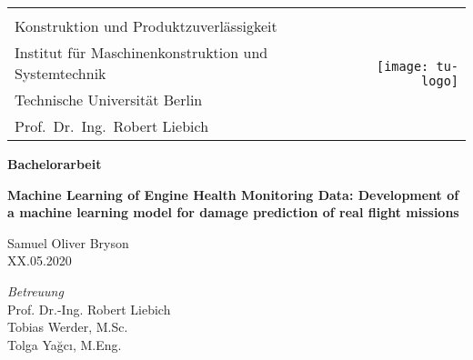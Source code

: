 
\begin{titlepage}

   {\footnotesize
   \begin{tabular}{l r}
      & \multirow{5}{*}{\hspace{5em}\texttt{[image: tu-logo]}} \\
      Konstruktion und Produktzuverl\"assigkeit \\
      Institut f\"ur Maschinenkonstruktion und Systemtechnik \\
      Technische Universit\"at Berlin \\
      Prof.~Dr.~Ing.~Robert Liebich \\
   \end{tabular}}

   {\centering

   \vspace{4.5cm}
   {\LARGE\bfseries Bachelorarbeit\par}
   \vspace{1.5cm}
   {\Large \textbf{Machine Learning of Engine Health Monitoring Data: Development of a machine learning model for damage prediction of real flight missions}\par}
   \vspace{1cm}

   \vspace{1cm}
   {\Large Samuel Oliver Bryson} \\
   \vspace{0.5cm}
   {\large XX.05.2020} \\}

   \vspace{3.5cm}
   \large{\textit{Betreuung}} \vspace{0.5cm} \\
   Prof. Dr.-Ing. Robert Liebich \\
   Tobias Werder, M.Sc. \\
   Tolga Ya\u{g}c\i{}, M.Eng. \\

\end{titlepage}